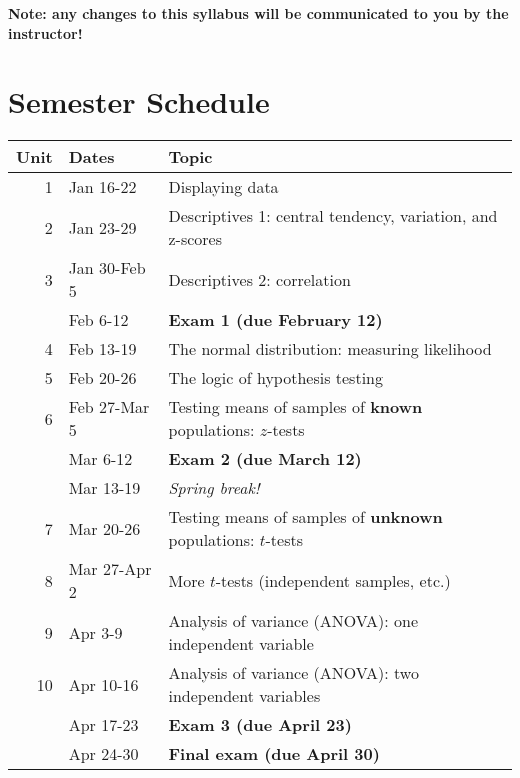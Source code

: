 \documentclass[10pt]{article}
\begin{document}
\textbf{\textbf{Note:  any changes to this syllabus will be communicated to you by the instructor!}}

\section*{Semester Schedule}
\label{sec-10}
\begin{center}
\begin{tabular}{rll}
Unit & Dates & Topic\\
\hline
1 & Jan 16-22 & Displaying data\\
2 & Jan 23-29 & Descriptives 1: central tendency, variation, and z-scores\\
3 & Jan 30-Feb 5 & Descriptives 2: correlation\\
 & Feb 6-12 & \textbf{Exam 1 (due February 12)}\\
4 & Feb 13-19 & The normal distribution: measuring likelihood\\
5 & Feb 20-26 & The logic of hypothesis testing\\
6 & Feb 27-Mar 5 & Testing means of samples of \textbf{known} populations: $z$-tests\\
 & Mar 6-12 & \textbf{Exam 2 (due March 12)}\\
 & Mar 13-19 & \emph{Spring break!}\\
7 & Mar 20-26 & Testing means of samples of \textbf{unknown} populations: $t$-tests\\
8 & Mar 27-Apr 2 & More $t$-tests (independent samples, etc.)\\
9 & Apr 3-9 & Analysis of variance (ANOVA): one independent variable\\
10 & Apr 10-16 & Analysis of variance (ANOVA): two independent variables\\
 & Apr 17-23 & \textbf{Exam 3 (due April 23)}\\
 & Apr 24-30 & \textbf{Final exam (due April 30)}\\
\end{tabular}
\end{center}
\end{document}
